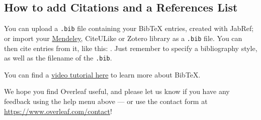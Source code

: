 \documentclass[a4paper]{article}
\begin{document}
\subsection{How to add Citations and a References List}

You can upload a \verb|.bib| file containing your BibTeX entries, created with JabRef; or import your \href{https://www.overleaf.com/blog/184}{Mendeley}, CiteULike or Zotero library as a \verb|.bib| file. You can then cite entries from it, like this: \cite{greenwade93}. Just remember to specify a bibliography style, as well as the filename of the \verb|.bib|.

You can find a \href{https://www.overleaf.com/help/97-how-to-include-a-bibliography-using-bibtex}{video tutorial here} to learn more about BibTeX.

We hope you find Overleaf useful, and please let us know if you have any feedback using the help menu above --- or use the contact form at \url{https://www.overleaf.com/contact}!



\end{document}
